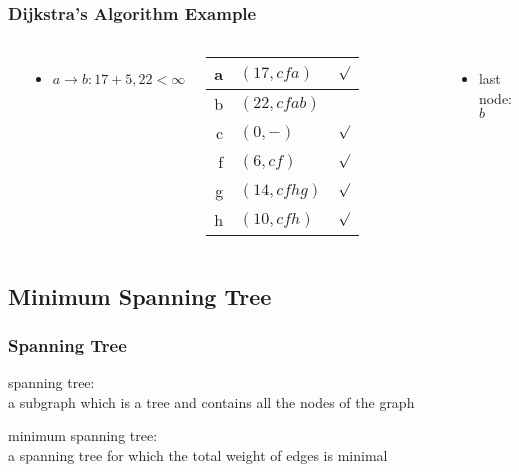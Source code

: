 \documentclass[dvipsnames]{beamer}
\begin{document}
\begin{frame}
  \frametitle{Dijkstra's Algorithm Example}

  \begin{example}[from node $a$ - base distance=$17$]
    \begin{columns}
      \begin{center}
      \end{center}

      \begin{itemize}
        \item $a \rightarrow b: 17+5, 22 < \infty$
      \end{itemize}

      \pause
      \begin{table}
        \begin{tabular}{r|l|c}
          a & $(17,cfa)$   & $\surd$ \\\hline
          b & $(22,cfab)$  & \\\hline
          c & $(0,-)$      & $\surd$ \\\hline
          f & $(6,cf)$     & $\surd$ \\\hline
          g & $(14,cfhg)$  & $\surd$ \\\hline
          h & $(10,cfh)$   & $\surd$
        \end{tabular}
      \end{table}

      \pause
      \begin{itemize}
        \item last node: $b$
      \end{itemize}
    \end{columns}
  \end{example}
\end{frame}

\subsection{Minimum Spanning Tree}

\begin{frame}
  \frametitle{Spanning Tree}

  \begin{definition}
    \alert{spanning tree}:\\
    a subgraph which is a tree and contains all the nodes of the graph
  \end{definition}

  \pause
  \begin{definition}
    \alert{minimum spanning tree}:\\
    a spanning tree for which the total weight of edges is minimal
  \end{definition}
\end{frame}
\end{document}
